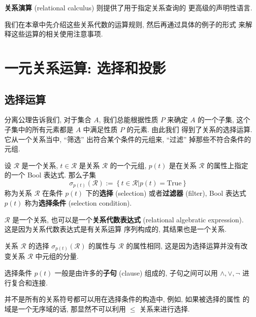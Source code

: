 \documentclass[10pt,UTF8]{book} %
\begin{document}
\textbf{关系演算} (relational calculus) 则提供了用于指定关系查询的
更高级的声明性语言.

我们在本章中先介绍这些关系代数的运算规则, 然后再通过具体的例子的形式
来解释这些运算的相关使用注意事项.

\section{一元关系运算: 选择和投影}

\subsection{选择运算}

分离公理告诉我们, 对于集合 $A$, 我们总能根据性质 $P$ 来确定
$A$ 的一个子集, 这个子集中的所有元素都是 $A$ 中满足性质 $P$ 的元素. 由此我们
得到了关系的选择运算. 它从一个关系当中, “筛选” 出符合某个条件的元组来, “过滤”
掉那些不符合条件的元组.

\begin{definition}[选择运算]
    设 $\mathcal{R}$ 是一个关系, $t \in \mathcal{R}$ 是关系 $\mathcal{R}$ 的一个元组,
    $p(t)$ 是在关系 $\mathcal{R}$ 的属性上指定的一个 Bool 表达式. 那么子集
    \[ \sigma_{p(t)}(\mathcal{R}) := \left\{
        t \in \mathcal{R} | p(t) = \mathrm{True}
    \right\} \]
    称为关系 $\mathcal{R}$ 在条件 $p(t)$ 下的\textbf{选择} (selection)
    或者\textbf{过滤器} (filter), Bool 表达式 $p(t)$ 称为\textbf{选择条件}
    (selection condition).
\end{definition}
\begin{remark}
    $\mathcal{R}$ 是一个关系, 也可以是一个\textbf{关系代数表达式}
    (relational algebratic expression). 这是因为关系代数表达式是有关系运算
    序列构成的, 其结果也是一个关系.
\end{remark}
\begin{remark}
    关系 $\mathcal{R}$ 的选择 $\sigma_{p(t)} (\mathcal{R})$ 的属性与
    $\mathcal{R}$ 的属性相同, 这是因为选择运算并没有改变关系 $\mathcal{R}$
    中元组的分量.
\end{remark}
\begin{remark}
    选择条件 $p(t)$ 一般是由许多的\textbf{子句} (clause) 组成的,
    子句之间可以用 $\wedge, \vee, \lnot$ 进行复合和连接.
\end{remark}
\begin{remark}
    并不是所有的关系符号都可以用在选择条件的构造中, 例如, 如果被选择的属性
    的域是一个无序域的话, 那显然不可以利用 $\leqslant$ 关系来进行选择.
\end{remark}
\end{document}
